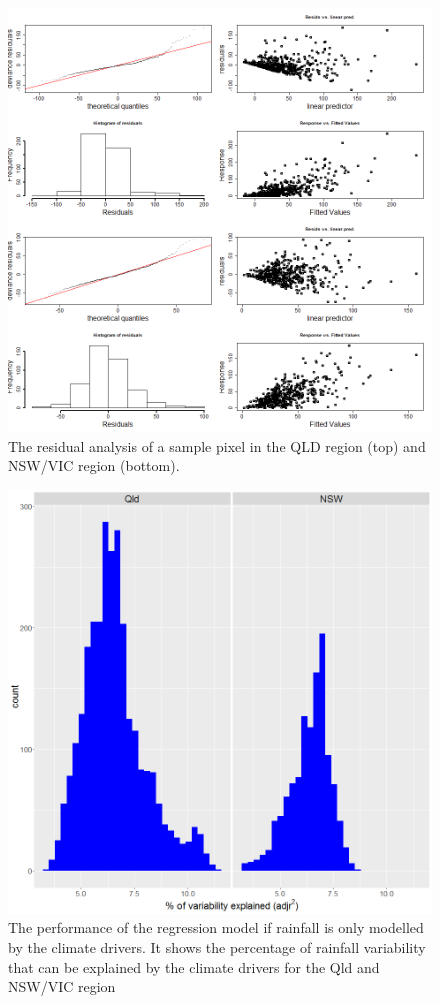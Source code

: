 \documentclass[fleqn,10pt,lineno]{wlpeerj} %
\begin{document}
\begin{figure}
\includegraphics[width=0.9\linewidth]{figures/gam_check} \caption{The residual analysis of a sample pixel in the QLD region (top) and NSW/VIC region (bottom).}\label{fig:residuals}
\end{figure}

\begin{figure}
\includegraphics[width=0.9\linewidth]{figures/soi_explhistogram} \caption{The performance of the regression model if rainfall is only modelled by the climate drivers. It shows the percentage of rainfall variability that can be explained by the climate drivers for the Qld and NSW/VIC region}\label{fig:rsq}
\end{figure}
\end{document}
